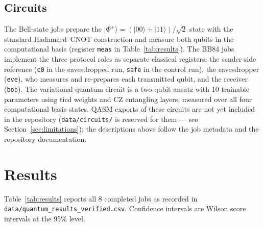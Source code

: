 \documentclass[11pt]{article}
\begin{document}
\subsection{Circuits}
The Bell-state jobs prepare the
$|\Phi^+\rangle=(|00\rangle+|11\rangle)/\sqrt{2}$
state with the standard Hadamard--CNOT construction and measure both qubits
in the computational basis (register \texttt{meas} in
Table~\ref{tab:results}). The BB84 jobs implement the three protocol roles
as separate classical registers: the sender-side reference (\texttt{c0} in
the eavesdropped run, \texttt{safe} in the control run), the eavesdropper
(\texttt{eve}), who measures and re-prepares each transmitted qubit, and the
receiver (\texttt{bob}). The variational quantum circuit is a two-qubit
ansatz with 10 trainable parameters using tied weights and CZ entangling
layers, measured over all four computational basis states. QASM exports of
these circuits are not yet included in the repository
(\texttt{data/circuits/} is reserved for them --- see
Section~\ref{sec:limitations}); the descriptions above follow the job
metadata and the repository documentation.

\section{Results}

Table~\ref{tab:results} reports all 8 completed jobs as recorded in
\texttt{data/quantum\_results\_verified.csv}. Confidence intervals are
Wilson score intervals at the 95\% level.

\begin{table}[htbp]
\centering
\caption{Verified experiment results (8 jobs, 39{,}010 total shots).}
\label{tab:results}
\end{table}
\end{document}
